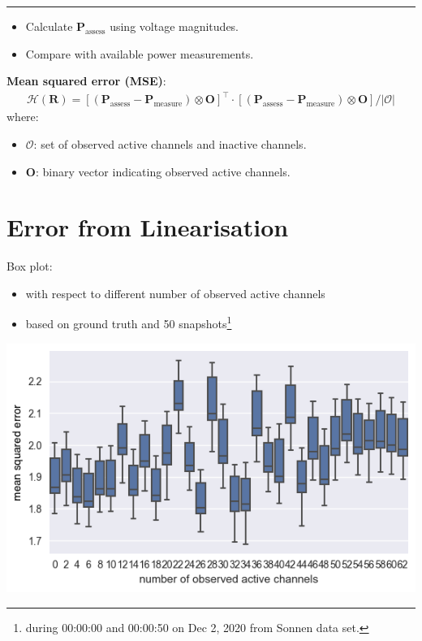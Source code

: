 \documentclass[
]{book}
\providecommand{\tightlist}{%
  \setlength{\itemsep}{0pt}\setlength{\parskip}{0pt}}
\begin{document}
\begin{center}\rule{0.5\linewidth}{0.5pt}\end{center}

\begin{itemize}
\tightlist
\item
  Calculate \(\boldsymbol{P}_\text{assess}\) using voltage magnitudes.
\item
  Compare with available power measurements.
\end{itemize}

\textbf{Mean squared error (MSE)}:
\[ \begin{aligned}
  \mathcal{H}(\boldsymbol{R}) =
  \left[
    (\boldsymbol{P}_\text{assess} - \boldsymbol{P}_\text{measure})
    \otimes \boldsymbol{O}
  \right]^\top
  \cdot \left[
    (\boldsymbol{P}_\text{assess} - \boldsymbol{P}_\text{measure})
    \otimes \boldsymbol{O}
  \right]
  / |\mathcal{O}|
\end{aligned} \]
where:

\begin{itemize}
\tightlist
\item
  \(\mathcal{O}\): set of observed active channels and inactive channels.
\item
  \(\boldsymbol{O}\): binary vector indicating observed active channels.
\end{itemize}

\hypertarget{error}{%
\section{Error from Linearisation}\label{error}}

Box plot:

\begin{itemize}
\tightlist
\item
  with respect to different number of observed active channels
\item
  based on ground truth and 50 snapshots\footnote{during 00:00:00 and 00:00:50 on Dec
    2, 2020 from Sonnen data set.}
\end{itemize}

\begin{center}\includegraphics{Pictures/figErrorObsBRM} \end{center}
\end{document}

